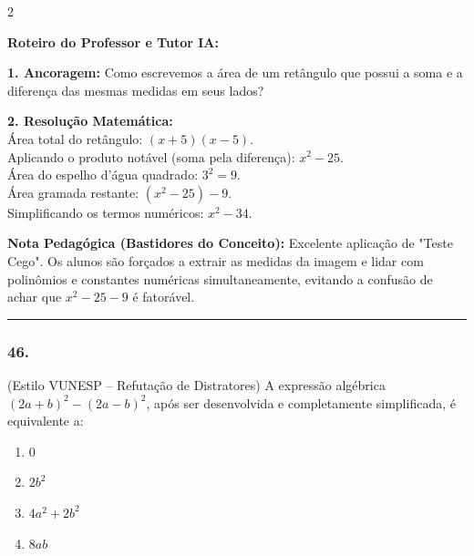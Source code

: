 \begin{multicols*}{2}
\ifgabarito
    \begin{tcolorbox}[colback=CorTitUm!5, colframe=CorTitUm, boxrule=1pt, arc=4pt, left=6pt, right=6pt, top=6pt, bottom=6pt]
    \small\textbf{\textcolor{CorTitUm}{Roteiro do Professor e Tutor IA:}}\par\vspace{0.1cm}
    \color{CinzaEscuro}
    \textbf{1. Ancoragem:} Como escrevemos a área de um retângulo que possui a soma e a diferença das mesmas medidas em seus lados?\par\vspace{0.1cm}
    \textbf{2. Resolução Matemática:}\\
    Área total do retângulo: $(x + 5)(x - 5)$.\\
    Aplicando o produto notável (soma pela diferença): $x^2 - 25$.\\
    Área do espelho d'água quadrado: $3^2 = 9$.\\
    Área gramada restante: $(x^2 - 25) - 9$.\\
    Simplificando os termos numéricos: $x^2 - 34$.
    \end{tcolorbox}
    \vspace{0.15cm}
    
    \begin{boxexplicacao}
    \textbf{Nota Pedagógica (Bastidores do Conceito):} Excelente aplicação de "Teste Cego". Os alunos são forçados a extrair as medidas da imagem e lidar com polinômios e constantes numéricas simultaneamente, evitando a confusão de achar que $x^2 - 25 - 9$ é fatorável.
    \end{boxexplicacao}
\fi

\par\vspace{\espacoQuestao}

\noindent\textcolor{CorLinha}{\rule{\linewidth}{0.5pt}} 
\par\vspace{\espacoPreQuestao}
\subsubsection*{46.} 
\begin{enunciadoLiteral}
(Estilo VUNESP -- Refutação de Distratores) A expressão algébrica $(2a + b)^2 - (2a - b)^2$, após ser desenvolvida e completamente simplificada, é equivalente a:

\begin{enumerate}[label=\alph*), itemsep=\espacoAlt]
    \item $0$
    \item $2b^2$
    \item $4a^2 + 2b^2$
    \item $8ab$
\end{enumerate}


\end{enunciadoLiteral}
\end{multicols*}
